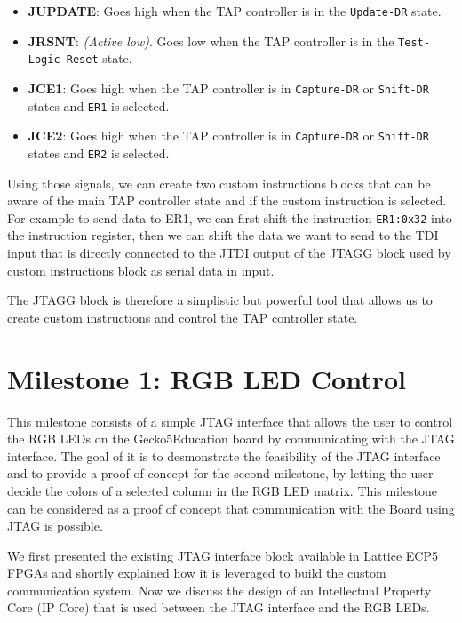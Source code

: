 \documentclass[a4paper,11pt,oneside]{report}
\newcommand{\boardName}{Gecko5Education \xspace}
\begin{document}
\begin{itemize}
\begin{itemize}
        \item \textbf{JUPDATE}: Goes high when the TAP controller is in the \texttt{Update-DR} state.
        
        \item \textbf{JRSNT}: \emph{(Active low)}. Goes low when the TAP controller is in the 
        \texttt{Test-Logic-Reset} state.
        
        \item \textbf{JCE1}: Goes high when the TAP controller is in \texttt{Capture-DR} or 
        \texttt{Shift-DR} states and \texttt{ER1} is selected.

        \item \textbf{JCE2}: Goes high when the TAP controller is in \texttt{Capture-DR} or 
        \texttt{Shift-DR} states and \texttt{ER2} is selected.
    \end{itemize}
\end{itemize}

Using those signals, we can create two custom instructions blocks that can be aware of the main TAP controller state and if the custom instruction is selected.
For example to send data to ER1, we can first shift the instruction \texttt{ER1:0x32} into the instruction register, then we can shift the data we want to send 
to the TDI input that is directly connected to the JTDI output of the JTAGG block used by custom instructions block as serial data in input.

The JTAGG block is therefore a simplistic but powerful tool that allows us to create custom instructions and control the TAP controller state.\\

\section{Milestone 1: RGB LED Control}

This milestone consists of a simple JTAG interface that allows the user to control the RGB LEDs on the \boardName board by communicating with the JTAG interface.
The goal of it is to desmonstrate the feasibility of the JTAG interface and to provide a proof of concept for the second milestone, by 
letting the user decide the colors of a selected column in the RGB LED matrix. This milestone can be considered as a proof of concept that communication with the Board
using JTAG is possible.

We first presented the existing JTAG interface block available in Lattice ECP5 FPGAs 
and shortly explained how it is leveraged to build the custom communication system.  
Now we discuss the design of an Intellectual Property Core (IP Core) that is used between the JTAG interface and the
RGB LEDs.  
\end{document}

